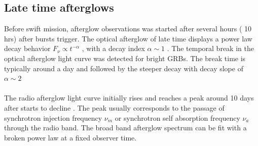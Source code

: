 \subsection{Late time afterglows }
Before swift mission, afterglow observations was started after several hours ( 10 hrs) after bursts trigger. The optical afterglow of late time displays a power law decay behavior $ F_{\nu}   \propto   t^{-\alpha} $  , with a decay index  $\alpha  \sim  1 $ . The temporal break in the optical afterglow light curve was detected for bright GRBs. The break time is typically around a day and followed by the steeper decay with decay slope of $ \alpha  \sim 2 $ \citep{24}\\\\
The radio afterglow light curve initially rises and reaches a peak around 10 days
after  starts to decline . The peak usually corresponds to the passage of synchrotron injection frequency $ \nu_{m} $ or synchrotron self absorption frequency $ \nu_{a} $through the radio band. The broad band afterglow spectrum can be fit with a broken power law at a fixed observer time.\citep{25}

